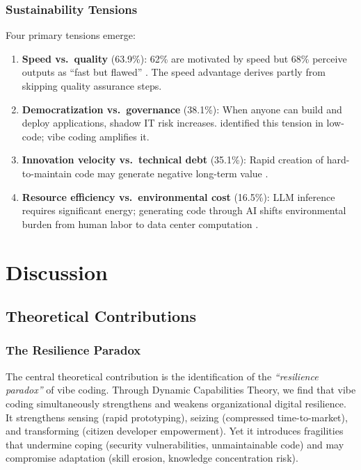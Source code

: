 \documentclass[preprint,12pt,authoryear]{elsarticle}
\begin{document}
\subsubsection{Sustainability Tensions}

Four primary tensions emerge:

\begin{enumerate}
  \item \textbf{Speed vs.\ quality} (63.9\%): 62\% are motivated by speed but 68\% perceive outputs as ``fast but flawed'' \citep{Fawzy2025}. The speed advantage derives partly from skipping quality assurance steps.
  \item \textbf{Democratization vs.\ governance} (38.1\%): When anyone can build and deploy applications, shadow IT risk increases. \citet{Sanchis2020} identified this tension in low-code; vibe coding amplifies it.
  \item \textbf{Innovation velocity vs.\ technical debt} (35.1\%): Rapid creation of hard-to-maintain code may generate negative long-term value \citep{VibeCodingFlowDebt2025, Pressman2020}.
  \item \textbf{Resource efficiency vs.\ environmental cost} (16.5\%): LLM inference requires significant energy; generating code through AI shifts environmental burden from human labor to data center computation \citep{Strubell2019}.
\end{enumerate}


\section{Discussion}
\label{sec:discussion}

\subsection{Theoretical Contributions}

\subsubsection{The Resilience Paradox}

The central theoretical contribution is the identification of the \emph{``resilience paradox''} of vibe coding. Through Dynamic Capabilities Theory, we find that vibe coding simultaneously strengthens and weakens organizational digital resilience. It strengthens sensing (rapid prototyping), seizing (compressed time-to-market), and transforming (citizen developer empowerment). Yet it introduces fragilities that undermine coping (security vulnerabilities, unmaintainable code) and may compromise adaptation (skill erosion, knowledge concentration risk).
\end{document}
